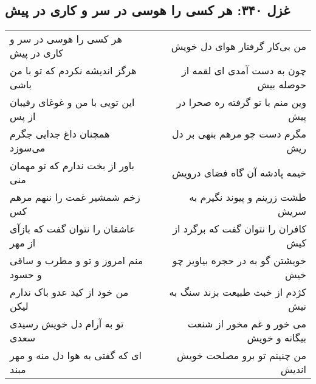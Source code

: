 \begin{center}
\section*{غزل ۳۴۰: هر کسی را هوسی در سر و کاری در پیش}
\label{sec:340}
\begin{longtable}{l p{0.5cm} r}
هر کسی را هوسی در سر و کاری در پیش
&&
من بی‌کار گرفتار هوای دل خویش
\\
هرگز اندیشه نکردم که تو با من باشی
&&
چون به دست آمدی ای لقمه از حوصله بیش
\\
این تویی با من و غوغای رقیبان از پس
&&
وین منم با تو گرفته ره صحرا در پیش
\\
همچنان داغ جدایی جگرم می‌سوزد
&&
مگرم دست چو مرهم بنهی بر دل ریش
\\
باور از بخت ندارم که تو مهمان منی
&&
خیمه پادشه آن گاه فضای درویش
\\
زخم شمشیر غمت را ننهم مرهم کس
&&
طشت زرینم و پیوند نگیرم به سریش
\\
عاشقان را نتوان گفت که بازآی از مهر
&&
کافران را نتوان گفت که برگرد از کیش
\\
منم امروز و تو و مطرب و ساقی و حسود
&&
خویشتن گو به در حجره بیاویز چو خیش
\\
من خود از کید عدو باک ندارم لیکن
&&
کژدم از خبث طبیعت بزند سنگ به نیش
\\
تو به آرام دل خویش رسیدی سعدی
&&
می خور و غم مخور از شنعت بیگانه و خویش
\\
ای که گفتی به هوا دل منه و مهر مبند
&&
من چنینم تو برو مصلحت خویش اندیش
\\
\end{longtable}
\end{center}
